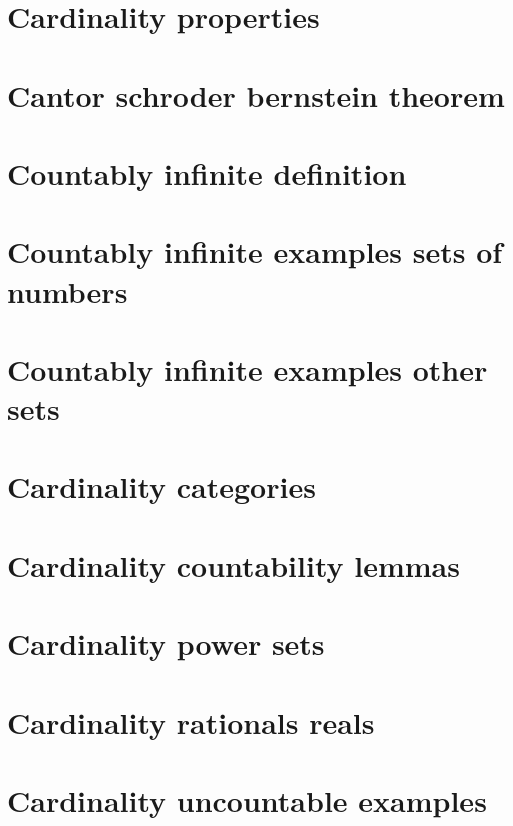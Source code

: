 \section*{Cardinality properties}

\vfill
\section*{Cantor schroder bernstein theorem}

\vfill
\section*{Countably infinite definition}

\vfill
\section*{Countably infinite examples sets of numbers}

\vfill
\section*{Countably infinite examples other sets}

\vfill
\section*{Cardinality categories}

\vfill
\section*{Cardinality countability lemmas}

\vfill
\section*{Cardinality power sets}

\vfill
\section*{Cardinality rationals reals}

\vfill
\section*{Cardinality uncountable examples}

\vfill
